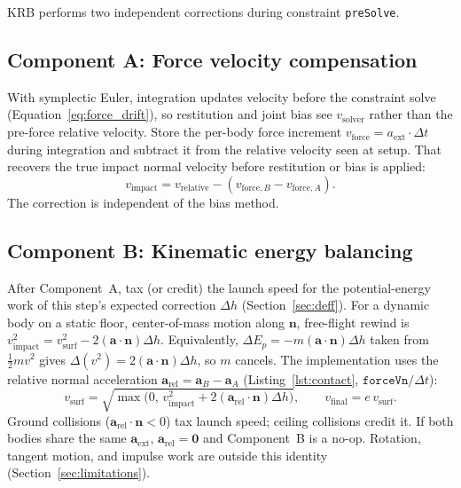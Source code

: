 \documentclass{jcgt}
\begin{document}
KRB performs two independent corrections during constraint \texttt{preSolve}.

\subsection{Component A: Force velocity compensation}

With symplectic Euler, integration updates velocity before the constraint solve (Equation~\ref{eq:force_drift}), so restitution and joint bias see $v_{\mathrm{solver}}$ rather than the pre-force relative velocity. Store the per-body force increment $v_{\mathrm{force}} = a_{\mathrm{ext}} \cdot \Delta t$ during integration and subtract it from the relative velocity seen at setup. That recovers the true impact normal velocity before restitution or bias is applied:
\begin{equation}
v_{\mathrm{impact}} = v_{\mathrm{relative}} - (v_{\mathrm{force},B} - v_{\mathrm{force},A}).
\label{eq:component_a}
\end{equation}
The correction is independent of the bias method.

\subsection{Component B: Kinematic energy balancing}

After Component~A, tax (or credit) the launch speed for the potential-energy work of this step's expected correction $\Delta h$ (Section~\ref{sec:deff}). For a dynamic body on a static floor, center-of-mass motion along $\mathbf{n}$, free-flight rewind is $v_{\mathrm{impact}}^2 = v_{\mathrm{surf}}^2 - 2(\mathbf{a}\cdot\mathbf{n})\Delta h$. Equivalently, $\Delta E_p = -m(\mathbf{a}\cdot\mathbf{n})\Delta h$ taken from $\tfrac12 m v^2$ gives $\Delta(v^2) = 2(\mathbf{a}\cdot\mathbf{n})\Delta h$, so $m$ cancels. The implementation uses the relative normal acceleration $\mathbf{a}_{\mathrm{rel}} = \mathbf{a}_B - \mathbf{a}_A$ (Listing~\ref{lst:contact}, $\texttt{forceVn}/\Delta t$):
\begin{equation}
v_{\mathrm{surf}} = \sqrt{\max\bigl(0,\, v_{\mathrm{impact}}^2 + 2 (\mathbf{a}_{\mathrm{rel}} \cdot \mathbf{n}) \Delta h\bigr)},
\qquad v_{\mathrm{final}} = e\, v_{\mathrm{surf}}.
\label{eq:vsurf}
\end{equation}
Ground collisions ($\mathbf{a}_{\mathrm{rel}}\cdot\mathbf{n}<0$) tax launch speed; ceiling collisions credit it. If both bodies share the same $\mathbf{a}_{\mathrm{ext}}$, $\mathbf{a}_{\mathrm{rel}}=\mathbf{0}$ and Component~B is a no-op. Rotation, tangent motion, and impulse work are outside this identity (Section~\ref{sec:limitations}).
\end{document}

